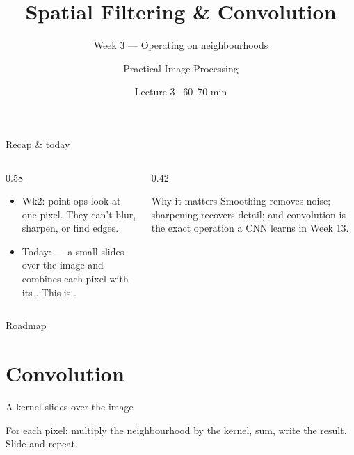 \documentclass[10pt,aspectratio=169]{beamer}
\title{Spatial Filtering \& Convolution}
\subtitle{Week 3 — Operating on neighbourhoods}
\author{Practical Image Processing}
\date{Lecture 3 \textbullet\ 60--70 min}
\begin{document}
\maketitle

\begin{frame}{Recap \& today}
  \begin{columns}[T]
    \begin{column}{0.58\textwidth}
      \begin{itemize}
        \item Wk2: point ops look at one pixel. They can't blur, sharpen, or find edges.
        \item \alert{Today:}  — a small  slides over the
              image and combines each pixel with its . This is .
      \end{itemize}
    \end{column}
    \begin{column}{0.42\textwidth}
      \begin{alertblock}{Why it matters}
        Smoothing removes noise; sharpening recovers detail; and convolution is the exact
        operation a CNN learns in Week 13.
      \end{alertblock}
    \end{column}
  \end{columns}
\end{frame}

\begin{frame}{Roadmap}\tableofcontents\end{frame}

\section{Convolution}

\begin{frame}{A kernel slides over the image}
  \begin{center}
  \end{center}
  For each pixel: multiply the neighbourhood by the kernel, sum, write the result. Slide and repeat.
\end{frame}
\end{document}
